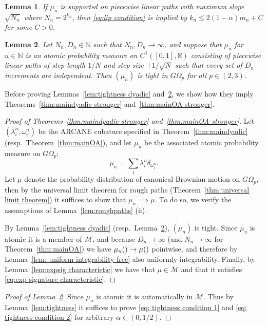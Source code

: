 \documentclass[11pt, letterpaper]{article}
\let\sig\relax
\DeclareMathOperator{\sig}{S}
\newtheorem{lemma}{Lemma}
\theoremstyle{definition}
\theoremstyle{remark}
\newcommand{\R}{\mathbb{R}}
\newcommand{\N}{\mathbb{N}}
\newcommand{\short}{ARCANE\xspace}
\begin{document}
\begin{appendices}
\begin{lemma}
     If $\mu_n$ is supported on piecewise linear paths with maximum slope $\sqrt{N_n}$ where $N_n = 2^{k_n}$, then \eqref{eq:lip condition} is implied by $k_n \le 2(1-\alpha) m_n + C$ for some $C > 0$.
\end{lemma}
\begin{lemma}\label{lem:tightness OA}
    Let $N_n, D_n\in \N$ such that $N_n , D_n \to \infty$, and suppose that $\mu_n$ for $n\in \N$ is an atomic probability measure on $C^1([0,1],\R)$ consisting of piecewise linear paths of step length $1 / N$ and step size $\pm 1 / \sqrt{N}$ such that every set of $D_n$ increments are independent. Then $(\mu_n)$ is tight in $G\Omega_p$ for all $p\in(2,3)$.
\end{lemma}


Before proving Lemmas~\ref{lem:tightness dyadic} and~\ref{lem:tightness OA}, we show how they imply Theorems~\ref{thm:maindyadic-stronger} and~\ref{thm:mainOA-stronger}.

\begin{proof}[Proof of Theorems~\ref{thm:maindyadic-stronger} and~\ref{thm:mainOA-stronger}]
    Let $(\lambda_i^n,\omega_i^n)$ be the \short cubature specified in Theorem~\ref{thm:maindyadic} (resp.\ Theorem~\ref{thm:mainOA}), and let $\mu_n$ be the associated atomic probability measure on $G\Omega_p$: \[
    \mu_n = \sum_i \lambda_i^n \delta_{\omega_i^n}.
    \] Let $\mu$ denote the probability distribution of canonical Brownian motion on $G\Omega_p$, then by the universal limit theorem for rough paths (Theorem~\ref{thm:universal limit theorem}) it suffices to show that $\mu_n \implies \mu$. To do so, we verify the assumptions of Lemma~\ref{lem:roughpaths} (ii).

    By Lemma~\ref{lem:tightness dyadic} (resp.\ Lemma~\ref{lem:tightness OA}), $(\mu_n)$ is tight. Since $\mu_n$ is atomic it is a member of $\mathcal{M}$, and because $D_n \to \infty$ (and $N_n \to \infty$ for Theorem~\ref{thm:mainOA}) we have $\mu_n(\sig) \to \mu(\sig)$ pointwise, and therefore by Lemma~\ref{lem: uniform integrability free} also uniformly integrability. Finally, by Lemma~\ref{lem:expsig characteristic} we have that $\mu\in \mathcal{M}$ and that it satisfies \eqref{eq:exp signature characteristic}.
\end{proof}
\begin{proof}[Proof of Lemma~\ref{lem:tightness OA}]
    Since $\mu_n$ is atomic it is automatically in $\mathcal{M}$. Thus by Lemma~\ref{lem:tightness} it suffices to prove \eqref{eq: tightness condition 1} and \eqref{eq: tightness condition 2} for arbitrary $\alpha \in (0,1/2)$.
    

\end{proof}
\end{appendices}
\end{document}
